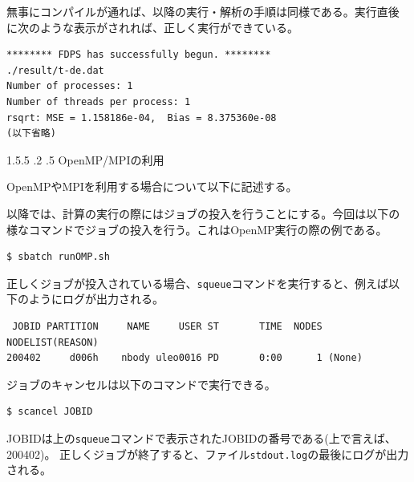 \documentclass[12pt,a4paper,dvipdfmx]{jarticle}
\makeatletter
\newcommand{\subsubsubsection}{\@startsection{paragraph}{4}{\z@}%
{1.5\baselineskip \@plus.5\dp0 \@minus.2\dp0}%
{.5\baselineskip \@plus2.3\dp0}%
{\reset@font\normalsize\bfseries}
}
\makeatother
\begin{document}
無事にコンパイルが通れば、以降の実行・解析の手順は同様である。実行直後
に次のような表示がされれば、正しく実行ができている。
\begin{screen}
\begin{verbatim}
******** FDPS has successfully begun. ********
./result/t-de.dat
Number of processes: 1
Number of threads per process: 1
rsqrt: MSE = 1.158186e-04,  Bias = 8.375360e-08
(以下省略)
\end{verbatim}
\end{screen}

\subsubsubsection{OpenMP/MPIの利用}

OpenMPやMPIを利用する場合について以下に記述する。

以降では、計算の実行の際にはジョブの投入を行うことにする。今回は以下の
様なコマンドでジョブの投入を行う。これはOpenMP実行の際の例である。
\begin{screen}
\begin{verbatim}
$ sbatch runOMP.sh
\end{verbatim}
\end{screen}
正しくジョブが投入されている場合、\texttt{squeue}コマンドを実行すると、例えば以
下のようにログが出力される。
\begin{screen}
\begin{verbatim}
 JOBID PARTITION     NAME     USER ST       TIME  NODES NODELIST(REASON)
200402     d006h    nbody uleo0016 PD       0:00      1 (None)
\end{verbatim}
\end{screen}
ジョブのキャンセルは以下のコマンドで実行できる。
\begin{screen}
\begin{verbatim}
$ scancel JOBID
\end{verbatim}
\end{screen}
JOBIDは上の\texttt{squeue}コマンドで表示されたJOBIDの番号である(上で言えば、
200402)。
正しくジョブが終了すると、ファイル\texttt{stdout.log}の最後にログが出力される。
\end{document}
